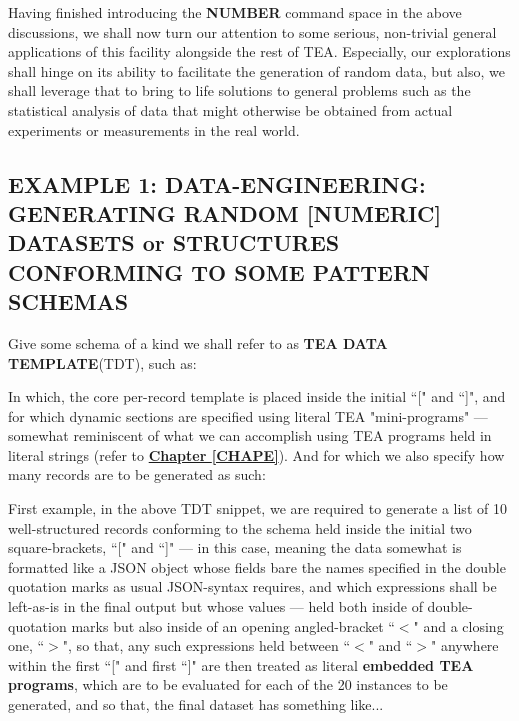 \documentclass[a4paper, 18pt]{book} %
\begin{document}
  
Having finished introducing the \textbf{NUMBER} command space in the above discussions, we shall now turn our attention to some serious, non-trivial general applications of this facility alongside the rest of TEA. Especially, our explorations shall hinge on its ability to facilitate the generation of random data, but also, we shall leverage that to bring to life solutions to general problems such as the statistical analysis of data that might otherwise be obtained from actual experiments or measurements in the real world.



\subsection{EXAMPLE 1: \textbf{DATA-ENGINEERING:} GENERATING RANDOM [NUMERIC] DATASETS or STRUCTURES CONFORMING TO SOME PATTERN SCHEMAS}
\label{SECEXAMP1N}


Give some schema of a kind we shall refer to as \textbf{TEA DATA TEMPLATE}(TDT), such as:


  \begin{tcbverbatim}
  \end{tcbverbatim}


In which, the core per-record template is placed inside the initial ``[" and ``]", and for which dynamic sections are specified using literal TEA "mini-programs" --- somewhat reminiscent of what we can accomplish using TEA programs held in literal strings (refer to \textbf{\hyperref[CHAPE]{Chapter \ref{CHAPE}}}). And for which we also specify how many records are to be generated as such:


First example, in the above TDT snippet, we are required to generate a list of 10 well-structured records conforming to the schema held inside the initial two square-brackets, ``[" and ``]" --- in this case, meaning the data somewhat is formatted like a JSON object whose fields bare the names specified in the double quotation marks as usual JSON-syntax requires, and which expressions shall be left-as-is in the final output but whose values --- held both inside of double-quotation marks but also inside of an opening angled-bracket ``$<$" and a closing one, ``$>$", so that, any such expressions held between ``$<$" and ``$>$" anywhere within the first ``[" and first ``]" are then treated as literal \textbf{embedded TEA programs}, which are to be evaluated for each of the 20 instances to be generated, and so that, the final dataset has something like...
\end{document}
